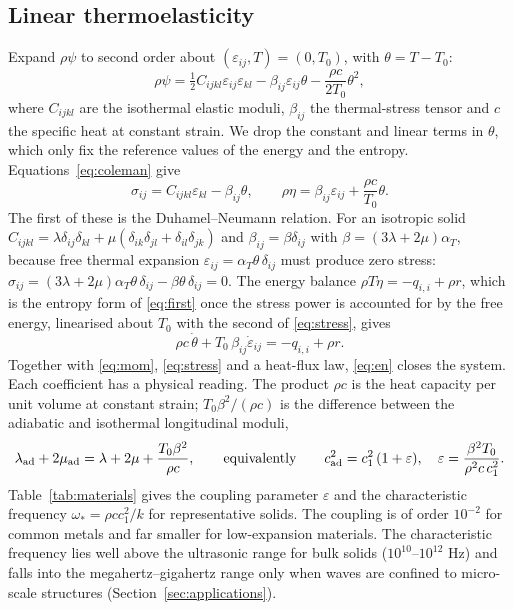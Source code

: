 \subsection{Linear thermoelasticity}
Expand $\rho\psi$ to second order about $(\varepsilon_{ij},T)=(0,T_0)$, with $\theta=T-T_0$:
\begin{equation}
\rho\psi=\tfrac12C_{ijkl}\varepsilon_{ij}\varepsilon_{kl}-\beta_{ij}\varepsilon_{ij}\theta-\frac{\rho c}{2T_0}\theta^2,\label{eq:psi}
\end{equation}
where $C_{ijkl}$ are the isothermal elastic moduli, $\beta_{ij}$ the thermal-stress tensor and $c$ the specific heat at constant strain. We drop the constant and linear terms in $\theta$, which only fix the reference values of the energy and the entropy. Equations~\eqref{eq:coleman} give
\begin{equation}
\sigma_{ij}=C_{ijkl}\varepsilon_{kl}-\beta_{ij}\theta,\qquad \rho\eta=\beta_{ij}\varepsilon_{ij}+\frac{\rho c}{T_0}\theta.\label{eq:stress}
\end{equation}
The first of these is the Duhamel--Neumann relation. For an isotropic solid $C_{ijkl}=\lambda\delta_{ij}\delta_{kl}+\mu(\delta_{ik}\delta_{jl}+\delta_{il}\delta_{jk})$ and $\beta_{ij}=\beta\delta_{ij}$ with $\beta=(3\lambda+2\mu)\alpha_T$, because free thermal expansion $\varepsilon_{ij}=\alpha_T\theta\,\delta_{ij}$ must produce zero stress: $\sigma_{ij}=(3\lambda+2\mu)\alpha_T\theta\,\delta_{ij}-\beta\theta\,\delta_{ij}=0$. The energy balance $\rho T\dot\eta=-q_{i,i}+\rho r$, which is the entropy form of \eqref{eq:first} once the stress power is accounted for by the free energy, linearised about $T_0$ with the second of \eqref{eq:stress}, gives
\begin{equation}
\rho c\,\dot\theta+T_0\,\beta_{ij}\dot\varepsilon_{ij}=-q_{i,i}+\rho r. \label{eq:en}
\end{equation}
Together with \eqref{eq:mom}, \eqref{eq:stress} and a heat-flux law, \eqref{eq:en} closes the system. Each coefficient has a physical reading. The product $\rho c$ is the heat capacity per unit volume at constant strain; $T_0\beta^2/(\rho c)$ is the difference between the adiabatic and isothermal longitudinal moduli,
\begin{equation}
\lambda_{\rm ad}+2\mu_{\rm ad}=\lambda+2\mu+\frac{T_0\beta^2}{\rho c},
\qquad\text{equivalently}\qquad c_{\rm ad}^2=c_1^2\,(1+\varepsilon),\quad \varepsilon=\frac{\beta^2T_0}{\rho^2c\,c_1^2}. \label{eq:adiabatic}
\end{equation}
Table~\ref{tab:materials} gives the coupling parameter $\varepsilon$ and the characteristic frequency $\omega_*=\rho c c_1^2/k$ for representative solids. The coupling is of order $10^{-2}$ for common metals and far smaller for low-expansion materials. The characteristic frequency lies well above the ultrasonic range for bulk solids ($10^{10}$--$10^{12}$ Hz) and falls into the megahertz--gigahertz range only when waves are confined to micro-scale structures (Section~\ref{sec:applications}).
